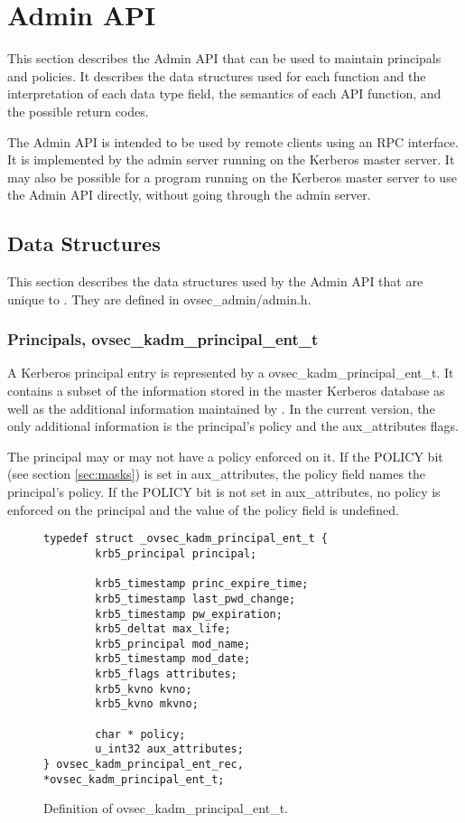 \section{Admin API}

This section describes the Admin API that can be used to maintain
principals and policies.  It describes the data structures used for
each function and the interpretation of each data type field, the
semantics of each API function, and the possible return codes.

The Admin API is intended to be used by remote clients using an RPC
interface.  It is implemented by the admin server running on the
Kerberos master server.  It may also be possible for a program running
on the Kerberos master server to use the Admin API directly, without
going through the admin server.

\subsection{Data Structures}

This section describes the data structures used by the Admin API that
are unique to \secure{}.  They are defined in ovsec_admin/admin.h.

\subsubsection{Principals, ovsec_kadm_principal_ent_t}
\label{sec:principal-structure}

A Kerberos principal entry is represented by a
ovsec_kadm_principal_ent_t.  It contains a subset of the information
stored in the master Kerberos database as well as the additional
information maintained by \secure{}.  In the current version, the only
additional information is the principal's policy and the
aux_attributes flags.

The principal may or may not have a policy enforced on it.  If the
POLICY bit (see section \ref{sec:masks}) is set in aux_attributes, the
policy field names the principal's policy.  If the POLICY bit is not
set in aux_attributes, no policy is enforced on the principal and the
value of the policy field is undefined.

\begin{figure}[htbp]
\begin{verbatim}
typedef struct _ovsec_kadm_principal_ent_t {
        krb5_principal principal;

        krb5_timestamp princ_expire_time;
        krb5_timestamp last_pwd_change;
        krb5_timestamp pw_expiration;
        krb5_deltat max_life;
        krb5_principal mod_name;
        krb5_timestamp mod_date;
        krb5_flags attributes;
        krb5_kvno kvno;
        krb5_kvno mkvno;

        char * policy;
        u_int32 aux_attributes;
} ovsec_kadm_principal_ent_rec, *ovsec_kadm_principal_ent_t;
\end{verbatim}
\caption{Definition of ovsec_kadm_principal_ent_t.}
\label{fig:princ-t}
\end{figure}

